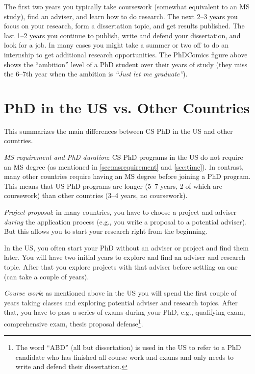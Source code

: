 \documentclass[oneside,11pt,dvipsnames]{book}
\newenvironment{commentbox}[1][]{
  \small
  \begin{mybox}
    {\small \textbf{#1}}
  }{
  \end{mybox}
}
\begin{document}
The first two years you typically take coursework (somewhat equivalent to an MS study), find an adviser, and learn how to do research.  The next 2--3 years you focus on your research, form a dissertation topic, and get results published. The last 1--2 years you continue to publish, write and defend your dissertation, and look for a job.
In many cases you might take a summer or two off to do an internship to get additional research opportunities.
The PhDComics figure above shows the ``ambition'' level of a PhD student over their years of study (they miss the 6--7th year when the ambition is \emph{``Just let me graduate''}).




\section{PhD in the US vs. Other Countries}\label{sec:non-us-differences}

This summarizes the main differences between CS PhD in the US and other countries. %

\emph{MS requirement and PhD duration}:  CS PhD programs in the US do not require an MS degree (as mentioned in \autoref{sec:msrequirement} and \autoref{sec:time}).  In contrast, many other countries require having an MS degree before joining a PhD program.  This means that US PhD programs are longer (5--7 years, 2 of which are coursework) than other countries (3--4 years, no coursework).

\emph{Project proposal}: in many countries, you have to choose a project and adviser \emph{during} the application process (e.g., you write a proposal to a potential adviser). But this allows you to start your research right from the beginning. 

In the US, you often start your PhD without an adviser or project and find them later. You will have two initial years to explore and find an adviser and research topic. After that you explore projects with that adviser before settling on one (can take a couple of years). 

\emph{Course work}: as mentioned above in the US you will spend the first couple of years taking classes and exploring potential adviser and research topics. 
After that, you have to pass a series of exams during your PhD, e.g., qualifying exam, comprehensive exam, thesis proposal defense\footnote{The word ``ABD'' (all but dissertation) is used in the US to refer to a PhD candidate who has finished all course work and exams and only needs to write and defend their dissertation.}.
\end{document}
